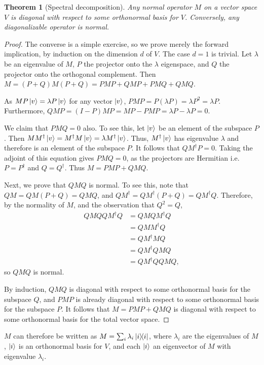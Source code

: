 \documentclass{article}
\newtheorem{theorem}{Theorem}
\numberwithin{theorem}{section}
\numberwithin{corollary}{section}
\numberwithin{postulate}{section}
\begin{document}
\begin{theorem}[Spectral decomposition]
  Any normal operator $M$ on a vector space $V$ is diagonal with respect to
  some orthonormal basis for $V$. Conversely, any diagonalizable operator is
  normal.
\end{theorem}
\begin{proof}
  The converse is a simple exercise, so we prove merely the forward
  implication, by induction on the dimension $d$ of $V$. The case $d = 1$ is
  trivial. Let $\lambda$ be an eigenvalue of $M$, $P$ the projector onto the
  $\lambda$ eigenspace, and $Q$ the projector onto the orthogonal complement.
  Then $M = (P + Q)M(P + Q) = PMP + QMP + PMQ + QMQ$.

  As $MP\ket{v} = \lambda P \ket{v}$ for any vector $\ket{v}$, $PMP = P(\lambda
  P) = \lambda P^2 = \lambda P$. Furthermore, $QMP = (I - P)MP = MP - PMP =
  \lambda P - \lambda P = 0$.

  We claim that $PMQ = 0$ also. To see this, let $\ket{v}$ be an element of the
  subspace $P$. Then $M M^\dagger \ket{v} = M^\dagger M \ket{v} = \lambda
  M^\dagger \ket{v}$. Thus, $M^\dagger \ket{v}$ has eigenvalue $\lambda$ and
  therefore is an element of the subspace $P$. It follows that $Q M^\dagger P =
  0$. Taking the adjoint of this equation gives $PMQ = 0$, as the projectors
  are Hermitian i.e. $P = P^\dagger$ and $Q = Q^\dagger$. Thus $M = PMP + QMQ$.

  Next, we prove that $QMQ$ is normal. To see this, note that $QM = QM(P + Q) =
  QMQ$, and $Q M^\dagger = Q M^\dagger (P+Q) = Q M^\dagger Q$. Therefore, by
  the normality of $M$, and the observation that $Q^2 = Q$, \begin{align*}
    Q M Q Q M^\dagger Q
    &= Q M Q M^\dagger Q \\
    &= Q M M^\dagger Q \\
    &= Q M^\dagger M Q \\
    &= Q M^\dagger Q M Q \\
    &= Q M^\dagger Q Q M Q,
  \end{align*} so $QMQ$ is normal.

  By induction, $QMQ$ is diagonal with respect to some orthonormal basis for
  the subspace $Q$, and $PMP$ is already diagonal with respect to some
  orthonormal basis for the subspace $P$. It follows that $M = PMP + QMQ$ is
  diagonal with respect to some orthonormal basis for the total vector space.
\end{proof}

$M$ can therefore be written as $M = \sum_i \lambda_i\op{i}{i}$, where
$\lambda_i$ are the eigenvalues of $M$, $\ket{i}$ is an orthonormal basis for
$V$, and each $\ket{i}$ an eigenvector of $M$ with eigenvalue $\lambda_i$.
\end{document}
